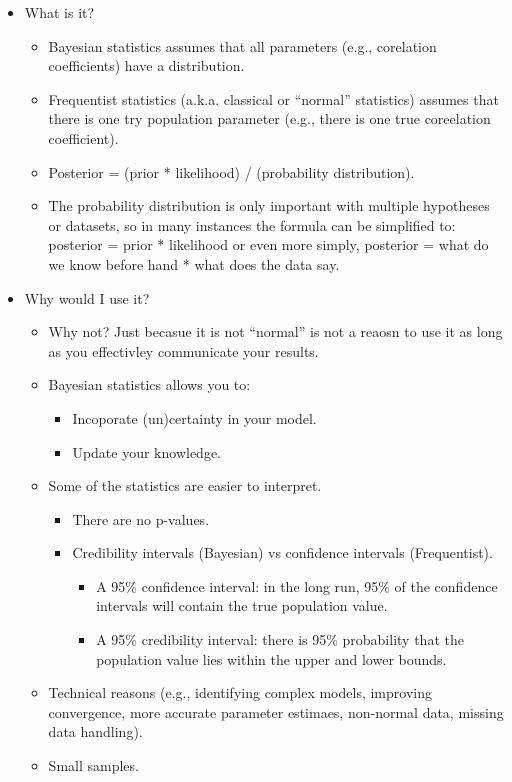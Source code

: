 \documentclass[
]{book}
\providecommand{\tightlist}{%
  \setlength{\itemsep}{0pt}\setlength{\parskip}{0pt}}
\begin{document}
\begin{itemize}
\tightlist
\item
  What is it?

  \begin{itemize}
  \tightlist
  \item
    Bayesian statistics assumes that all parameters (e.g., corelation coefficients) have a distribution.
  \item
    Frequentist statistics (a.k.a. classical or ``normal'' statistics) assumes that there is one try population parameter (e.g., there is one true coreelation coefficient).
  \item
    Posterior = (prior * likelihood) / (probability distribution).
  \item
    The probability distribution is only important with multiple hypotheses or datasets, so in many instances the formula can be simplified to: posterior = prior * likelihood or even more simply, posterior = what do we know before hand * what does the data say.
  \end{itemize}
\item
  Why would I use it?

  \begin{itemize}
  \tightlist
  \item
    Why not? Just becasue it is not ``normal'' is not a reaosn to use it as long as you effectivley communicate your results.
  \item
    Bayesian statistics allows you to:

    \begin{itemize}
    \tightlist
    \item
      Incoporate (un)certainty in your model.
    \item
      Update your knowledge.
    \end{itemize}
  \item
    Some of the statistics are easier to interpret.

    \begin{itemize}
    \tightlist
    \item
      There are no p-values.
    \item
      Credibility intervals (Bayesian) vs confidence intervals (Frequentist).

      \begin{itemize}
      \tightlist
      \item
        A 95\% confidence interval: in the long run, 95\% of the confidence intervals will contain the true population value.
      \item
        A 95\% credibility interval: there is 95\% probability that the population value lies within the upper and lower bounds.
      \end{itemize}
    \end{itemize}
  \item
    Technical reasons (e.g., identifying complex models, improving convergence, more accurate parameter estimaes, non-normal data, missing data handling).
  \item
    Small samples.


\end{itemize}
\end{itemize}
\end{document}
